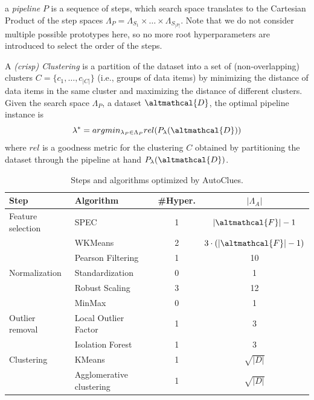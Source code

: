a \textit{pipeline} $P$ is a sequence of steps, which search space translates to the Cartesian Product of the step spaces $\Lambda_P = \Lambda_{S_1} \times \ldots \times \Lambda_{S_{|P|}}$.
Note that we do not consider multiple possible prototypes here, so no more root hyperparameters are introduced to select the order of the steps.

A \textit{(crisp) Clustering} is a partition of the dataset into a set of (non-overlapping) clusters  $C=\{c_1, \ldots, c_{|C|}\}$ (i.e., groups of data items) by minimizing the distance of data items in the same cluster and maximizing the distance of different clusters.
Given the search space $\Lambda_P$, a dataset $\altmathcal{D}$, the optimal pipeline instance is
\begin{equation}
\label{eq:optimization}
    \lambda^* = argmin_{\lambda_P \in \Lambda_P} rel(P_{\lambda}(\altmathcal{D}))
\end{equation}
where $rel$ is a goodness metric for the clustering $C$ obtained by partitioning the dataset through the pipeline at hand $P_{\lambda}(\altmathcal{D})$.


\begin{table}[t]
    \centering
    \begin{tabular}{llcc}
        \hline
        Step     & Algorithm & \#Hyper. & $|\Lambda_A|$\\\hline
        Feature selection & SPEC \cite{zhao2007spectral} & 1 & $|\altmathcal{F}|-1$\\
         & WKMeans \cite{WKMeans} & 2 & $3 \cdot (|\altmathcal{F}|-1)$\\
         & Pearson Filtering & 1 & 10\\
        Normalization     & Standardization & 0 & 1\\
        & Robust Scaling & 3 & 12\\
        & MinMax & 0 & 1\\
        Outlier removal   & Local Outlier Factor \cite{breunig2000lof} & 1 & 3\\
        & Isolation Forest \cite{liu2012isolation} & 1 & 3\\
        Clustering  & KMeans \cite{arthur2006k} & 1 & $\sqrt{|D|}$\\
        & Agglomerative clustering  \cite{murtagh2017algorithms} & 1 & $\sqrt{|D|}$\\\hline
    \end{tabular}
    \caption{Steps and algorithms optimized by AutoClues.}
    \label{clustering-tbl:processing}
\end{table}


